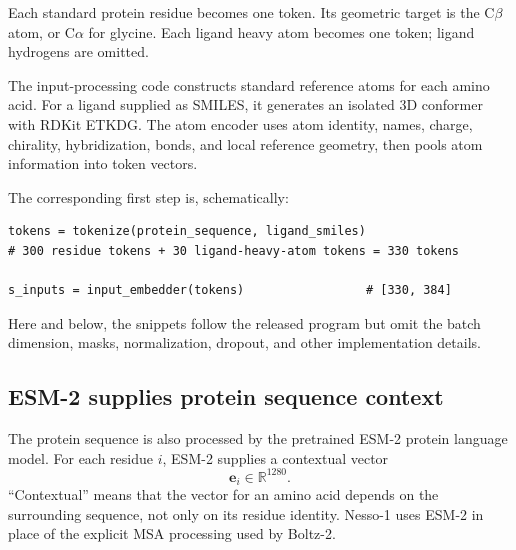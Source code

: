 \documentclass[11pt]{article}
\begin{document}
Each standard protein residue becomes one token. Its geometric target is the
C$\beta$ atom, or C$\alpha$ for glycine. Each ligand heavy atom becomes one
token; ligand hydrogens are omitted.

The input-processing code constructs standard reference atoms for each amino
acid. For a ligand supplied as SMILES, it generates an isolated 3D conformer
with RDKit ETKDG. The atom
encoder uses atom identity, names, charge, chirality, hybridization, bonds, and
local reference geometry, then pools atom information into token vectors.

The corresponding first step is, schematically:
\begin{verbatim}
tokens = tokenize(protein_sequence, ligand_smiles)
# 300 residue tokens + 30 ligand-heavy-atom tokens = 330 tokens

s_inputs = input_embedder(tokens)                 # [330, 384]
\end{verbatim}
Here and below, the snippets follow the released program but omit the batch
dimension, masks, normalization, dropout, and other implementation details.

\subsection{ESM-2 supplies protein sequence context}

The protein sequence is also processed by the pretrained ESM-2 protein language
model. For each residue $i$, ESM-2 supplies a contextual vector
\[
  \mathbf e_i\in\mathbb R^{1280}.
\]
``Contextual'' means that the vector for an amino acid depends on the surrounding
sequence, not only on its residue identity. Nesso-1 uses ESM-2 in place of the explicit MSA processing used by
Boltz-2.
\end{document}
